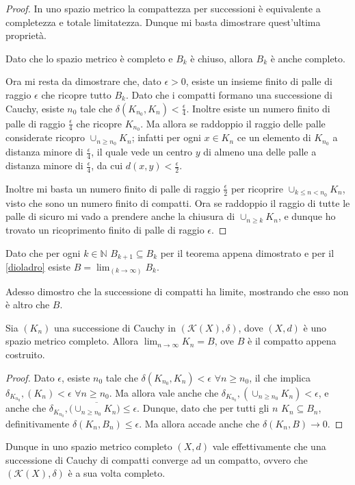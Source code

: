 \begin{proof}
In uno spazio metrico la compattezza per successioni è equivalente a completezza e totale limitatezza. Dunque mi basta dimostrare quest'ultima proprietà. 

Dato che lo spazio metrico è completo e $B_k$ è chiuso, allora $B_k$ è anche completo.

Ora mi resta da dimostrare che, dato $\epsilon>0$, esiste un insieme finito di palle di raggio $\epsilon$ che ricopre tutto $B_k$. Dato che i compatti formano una successione di Cauchy, esiste $n_0$ tale che $\delta(K_{n_0}, K_n)< \frac{\epsilon}{4}$. Inoltre esiste un numero finito di palle di raggio $\frac{\epsilon}{4}$ che ricopre $K_{n_0}$. Ma allora se raddoppio il raggio delle palle considerate ricopro $\cup_{n\geq n_0} K_n$; infatti per ogni $x \in K_n$ ce un elemento di $K_{n_0}$ a distanza minore di $\frac{\epsilon}{4}$, il quale vede un centro $y$ di almeno una delle palle a distanza minore di $\frac{\epsilon}{4}$, da cui $d(x,y)<\frac{\epsilon}{2}$.

Inoltre mi basta un numero finito di palle di raggio $\frac{\epsilon}{2}$ per ricoprire $\cup_{k \leq n< n_0} K_n$, visto che sono un numero finito di compatti. Ora se raddoppio il raggio di tutte le palle di sicuro mi vado a prendere anche la chiusura di $\cup_{n\geq k} K_n$, e dunque ho trovato un ricoprimento finito di palle di raggio $\epsilon$.
\end{proof}

Dato che per ogni $k\in \mathbb{N}$ $B_{k+1}\subseteq B_k$ per il teorema appena dimostrato e per il \cref{dioladro} esiste $B=\lim_(k \to \infty) B_k$.

Adesso dimostro che la successione di compatti ha limite, mostrando che esso non è altro che $B$.

\begin{theorem}
Sia $(K_n)$ una successione di Cauchy in $(\mathcal{K}(X),\delta ) $, dove $(X, d)$ è uno spazio metrico completo. Allora $\lim_{n \to \infty}K_n=B$, ove $B$ è il compatto appena costruito.
\end{theorem}

\begin{proof}
Dato $\epsilon$, esiste $n_0$ tale che $\delta (K_{n_0}, K_n)< \epsilon$ $\forall n\geq n_0$, il che implica $\delta _{K_{n_0}}, (K_n)<\epsilon$ $\forall n\geq n_0$. Ma allora vale anche che $\delta _{K_{n_0}}, (\cup_{n\geq n_0} K_n)<\epsilon$, e anche che $\delta _{K_{n_0}}, (\overline {\cup_{n\geq n_0} K_n)}\leq \epsilon$. Dunque, dato che per tutti gli $n$ $K_n \subseteq B_n$,  definitivamente $\delta (K_n, B_n) \leq \epsilon$. Ma allora accade anche che $\delta (K_n, B) \to 0$.
\end{proof}

Dunque in uno spazio metrico completo $(X,d)$ vale effettivamente che una successione di Cauchy di compatti converge ad un compatto, ovvero che $(\mathcal{K}(X),\delta ) $ è a sua volta completo.
